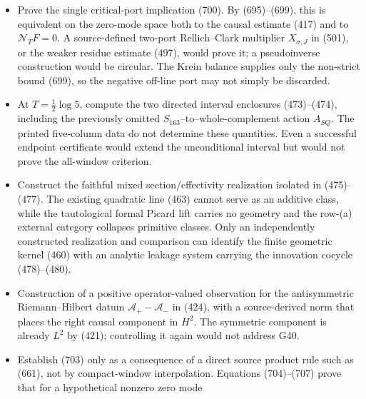 \documentclass[11pt]{article}
\begin{document}
\begin{itemize}
      identity (674) is ruled out by (684)--(687).  Concretely, use the
      joint graph (601)--(617) to construct a Hermitian boundary state.
      Merely adding the conservative skew exterior tail is insufficient:
      (688)--(691) prove that it cancels the non-Tate pole but leaves zero
      terminal.  The new state must instead retain the positive
      finite-part/residue energy and satisfy the product rule (661), not only
      the already proved commutator rule (672).
\item Prove the single critical-port implication (700).  By
      (695)--(699), this is equivalent on the zero-mode space both to the
      causal estimate (417) and to \(\mathcal N_TF=0\).  A source-defined
      two-port Rellich--Clark multiplier \(X_{\sigma,J}\) in (501), or the
      weaker residue estimate (497), would prove it; a pseudoinverse
      construction would be circular.  The Krein balance supplies only the
      non-strict bound (699), so the negative off-line port may not simply be
      discarded.
\item At $T=\frac12\log5$, compute the two directed interval enclosures
      (473)--(474), including the previously omitted
      $S_{163}$--to--whole-complement action $A_{SQ}$.  The printed
      five-column data do not determine these quantities.  Even a successful
      endpoint certificate would extend the unconditional interval but would
      not prove the all-window criterion.
\item Construct the faithful mixed section/effectivity realization isolated
      in (475)--(477).  The existing quadratic line (463) cannot serve as an
      additive class, while the tautological formal Picard lift carries no
      geometry and the row-(a) external category collapses primitive classes.
      Only an independently constructed realization and comparison can
      identify the finite geometric kernel (460) with an analytic leakage
      system carrying the innovation cocycle (478)--(480).
\item Construction of a positive operator-valued observation for the
      antisymmetric Riemann--Hilbert datum
      $\mathscr A_+-\mathscr A_-$ in (424), with a source-derived norm that
      places the right causal component in $H^2$.  The symmetric component
      is already $L^2$ by (421); controlling it again would not address G40.
\item Establish (703) only as a consequence of a direct source product
      rule such as (661), not by compact-window interpolation.
      Equations (704)--(707) prove that for a hypothetical nonzero zero mode

\end{itemize}
\end{document}
